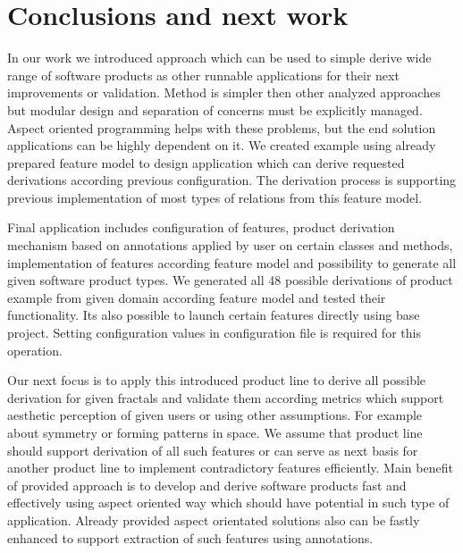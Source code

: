 \documentclass[11pt,english,a4paper,twoside]{article}
\begin{document}
\section{Conclusions and next work} \label{conclusions}

In our work we introduced approach which can be used to simple derive wide range of software products as other runnable applications for their next improvements or validation. Method is simpler then other analyzed approaches but modular design and separation of concerns must be explicitly managed. Aspect oriented programming helps with these problems, but the end solution applications can be highly dependent on it. We created example using already prepared feature model to design application which can derive requested derivations according previous configuration. The derivation process is supporting previous implementation of most types of relations from this feature model. 

Final application includes configuration of features, product derivation mechanism based on annotations applied by user on certain classes and methods, implementation of features according feature model and possibility to generate all given software product types.  We generated all 48 possible derivations of product example from given domain according feature model and tested their functionality. Its also possible to launch certain features directly using base project. Setting configuration values in configuration file is required for this operation.

Our next focus is to apply this introduced product line to derive all possible derivation for given fractals and validate them according metrics which support aesthetic perception of given users or using other assumptions. For example about symmetry or forming patterns in space. We assume that product line should support derivation of all such features or can serve as next basis for another product line to implement contradictory features efficiently. Main benefit of provided approach is to develop and derive software products fast and effectively using aspect oriented way which should have potential in such type of application. Already provided aspect orientated solutions also can be fastly enhanced to support extraction of such features using annotations.
 


\end{document}
